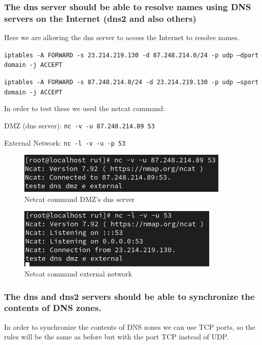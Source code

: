 \documentclass{article}
\begin{document}
\subsubsection{ The dns server should be able to resolve names using DNS servers on the Internet (dns2 and also others)}
\quad Here we are allowing the dns server to access the Internet to resolve names.

\texttt{}\par
\texttt{iptables -A FORWARD -s 23.214.219.130 -d 87.248.214.0/24 -p udp --dport domain -j ACCEPT}\par
\texttt{iptables -A FORWARD -s 87.248.214.0/24 -d 23.214.219.130 -p udp --sport domain -j ACCEPT}\par
\texttt{}\par

In order to test these we used the netcat command:
\texttt{}\par
\texttt{}\par
DMZ (dns server): \texttt{nc -v -u 87.248.214.89 53} \par
External Network: \texttt{nc -l -v -u -p 53} \par
\texttt{}\par
\begin{figure}[H]
    \centering
    \includegraphics[scale=0.5]{btw/btw_dns_external_dmz_newip.png}
    \caption{Netcat command DMZ's dns server}
    \label{fig:network-arc}
\end{figure}

\begin{figure}[H]
    \centering
    \includegraphics[scale=0.5]{btw/btw_dns_external_external_newip.png}
    \caption{Netcat command external network}
    \label{fig:network-arc}
\end{figure}



\subsubsection{ The dns and dns2 servers should be able to synchronize the contents of DNS zones.}
\quad In order to synchronize the contents of DNS zones we can use TCP ports, so the rules will be the same as before but with the port TCP instead of UDP.
\end{document}
